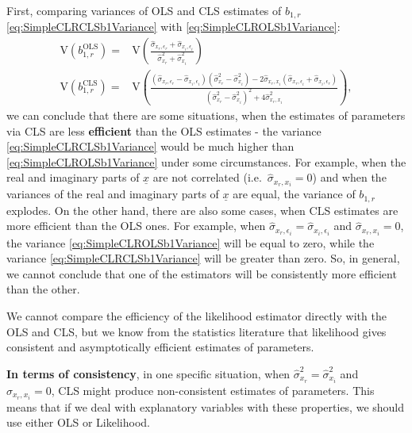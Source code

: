 \documentclass[
]{book}
\begin{document}
First, comparing variances of OLS and CLS estimates of \(b_{1,r}\) \eqref{eq:SimpleCLRCLSb1Variance} with \eqref{eq:SimpleCLROLSb1Variance}:
\begin{equation*}
    \begin{aligned}
        \mathrm{V}(b_{1,r}^{\mathrm{OLS}}) = & \mathrm{V}\left(\frac{\hat{\sigma}_{x_r, \epsilon_r} + \hat{\sigma}_{x_i, \epsilon_i}}{\hat{\sigma}_{x_r}^2 + \hat{\sigma}_{x_i}^2}\right) \\
        \mathrm{V}(b_{1,r}^{\mathrm{CLS}}) = & \mathrm{V}\left(\frac{\left(\hat{\sigma}_{x_r, \epsilon_r} - \hat{\sigma}_{x_i, \epsilon_i}\right) \left(\hat{\sigma}_{x_r}^2 - \hat{\sigma}_{x_i}^2 \right) - 2 \hat{\sigma}_{x_r, x_i} \left(\hat{\sigma}_{x_r, \epsilon_i} + \hat{\sigma}_{x_i, \epsilon_r}\right)}{\left(\hat{\sigma}_{x_r}^2 - \hat{\sigma}_{x_i}^2\right)^2 + 4 \hat{\sigma}_{x_r, x_i}^2}\right) ,
    \end{aligned}
\end{equation*}
we can conclude that there are some situations, when the estimates of parameters via CLS are less \textbf{efficient} than the OLS estimates - the variance \eqref{eq:SimpleCLRCLSb1Variance} would be much higher than \eqref{eq:SimpleCLROLSb1Variance} under some circumstances. For example, when the real and imaginary parts of \(\underline{x}\) are not correlated (i.e.~\(\hat{\sigma}_{x_r, x_i}=0\)) and when the variances of the real and imaginary parts of \(\underline{x}\) are equal, the variance of \(b_{1,r}\) explodes. On the other hand, there are also some cases, when CLS estimates are more efficient than the OLS ones. For example, when \(\hat{\sigma}_{x_r, \epsilon_i}=\hat{\sigma}_{x_i, \epsilon_i}\) and \(\hat{\sigma}_{x_r, x_i}=0\), the variance \eqref{eq:SimpleCLROLSb1Variance} will be equal to zero, while the variance \eqref{eq:SimpleCLRCLSb1Variance} will be greater than zero. So, in general, we cannot conclude that one of the estimators will be consistently more efficient than the other.

We cannot compare the efficiency of the likelihood estimator directly with the OLS and CLS, but we know from the statistics literature \citep{Wald1949} that likelihood gives consistent and asymptotically efficient estimates of parameters.

\textbf{In terms of consistency}, in one specific situation, when \(\hat{\sigma}_{x_r}^2 = \hat{\sigma}_{x_i}^2\) and \(\hat{\sigma}_{x_r, x_i}=0\), CLS might produce non-consistent estimates of parameters. This means that if we deal with explanatory variables with these properties, we should use either OLS or Likelihood.
\end{document}
